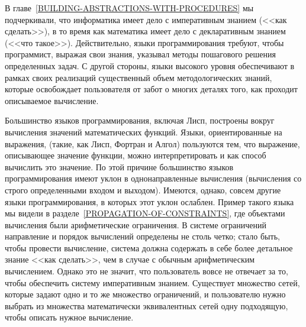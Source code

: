 В 
главе~\ref{BUILDING-ABSTRACTIONS-WITH-PROCEDURES} мы
подчеркивали, что информатика имеет дело с 
императивным знанием 
(<<как сделать>>), в то время как математика имеет дело с
декларативным знанием (<<что такое>>).  Действительно, языки
программирования требуют, чтобы программист, выражая свои знания,
указывал методы пошагового решения определенных задач.  С другой
стороны, языки высокого уровня обеспечивают в рамках своих реализаций
существенный объем методологических знаний, которые освобождает
пользователя от забот о многих деталях того, как проходит описываемое
вычисление.

Большинство языков программирования, включая Лисп, построены вокруг
вычисления значений математических функций.  Языки, ориентированные
на выражения, (такие, как Лисп, Фортран и Алгол) пользуются тем, что
выражение, описывающее значение функции,
можно интерпретировать и как способ вычислить это значение.  По этой
причине большинство языков программирования имеют уклон
в однонаправленные вычисления (вычисления со строго определенными
входом и выходом).  Имеются, однако, совсем другие языки
программирования, в которых этот уклон ослаблен.  Пример такого языка мы
видели в разделе~\ref{PROPAGATION-OF-CONSTRAINTS}, где
объектами вычисления были арифметические ограничения. В системе
ограничений направление и порядок вычислений определены не столь
четко; стало быть, чтобы провести вычисление, система должна
содержать в себе более детальное знание <<как сделать>>, чем в случае
с обычным арифметическим вычислением.  Однако это не значит, что
пользователь вовсе не отвечает за то, чтобы обеспечить систему
императивным знанием.  Существует множество сетей, которые
задают одно и то же множество ограничений, и пользователю нужно
выбрать из множества математически эквивалентных сетей одну подходящую,
чтобы описать нужное вычисление.

